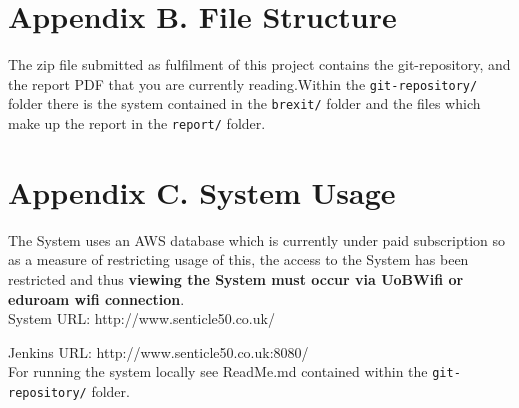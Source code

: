 \documentclass[11pt]{report}
\begin{document}
\section*{Appendix B. File Structure}
The zip file submitted as fulfilment of this project contains the git-repository, and the report PDF that you are currently reading.Within the \texttt{git-repository/} folder there is the system contained in the \texttt{brexit/} folder and the files which make up the report in the \texttt{report/} folder.
\section*{Appendix C. System Usage}
The System uses an AWS database which is currently under paid subscription so as a measure of restricting usage of this, the access to the System has been restricted and thus \textbf{viewing the System must occur via UoBWifi or eduroam wifi connection}.
\\

System URL: http://www.senticle50.co.uk/

Jenkins URL: http://www.senticle50.co.uk:8080/
\\

For running the system locally see ReadMe.md contained within the \texttt{git-repository/} folder.
\end{document}
